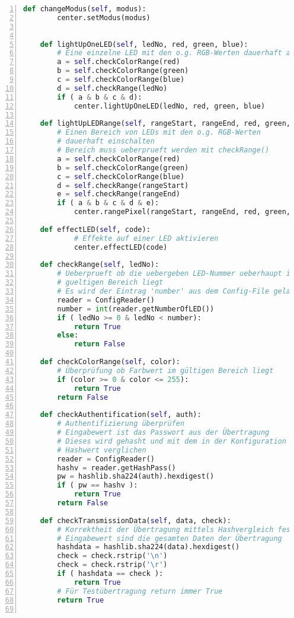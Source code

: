 \begin{lstlisting}[caption =Implementierung des SSL Servers, language=python, frame=single, breaklines=true,columns=fullflexible, commentstyle=\color{gray}\upshape, captionpos=b, numbers = left]
    def changeModus(self, modus):
        center.setModus(modus)


    def lightUpOneLED(self, ledNo, red, green, blue):
        # Eine einzelne LED mit den o.g. RGB-Werten dauerhaft anschalten
        a = self.checkColorRange(red)
        b = self.checkColorRange(green)
        c = self.checkColorRange(blue)
        d = self.checkRange(ledNo)
        if ( a & b & c & d):
            center.lightUpOneLED(ledNo, red, green, blue)

    def lightUpLEDRange(self, rangeStart, rangeEnd, red, green, blue):
        # Einen Bereich von LEDs mit den o.g. RGB-Werten
        # dauerhaft einschalten
        # Bereich muss ueberprueft werden mit checkRange()
        a = self.checkColorRange(red)
        b = self.checkColorRange(green)
        c = self.checkColorRange(blue)
        d = self.checkRange(rangeStart)
        e = self.checkRange(rangeEnd)
        if ( a & b & c & d & e):
            center.rangePixel(rangeStart, rangeEnd, red, green, blue)

    def effectLED(self, code):
            # Effekte auf einer LED aktivieren
            center.effectLED(code)

    def checkRange(self, ledNo):
        # Ueberprueft ob die uebergeben LED-Nummer ueberhaupt im
        # gueltigen Bereich liegt
        # Es wird der Eintrag 'number' aus dem Config-File geladen
        reader = ConfigReader()
        number = int(reader.getNumberOfLED())
        if ( ledNo >= 0 & ledNo < number):
            return True
        else:
            return False

    def checkColorRange(self, color):
        # Überprüfung ob Farbwert im gültigen Bereich liegt
        if (color >= 0 & color <= 255):
            return True
        return False

    def checkAuthentification(self, auth):
        # Authentifizierung überprüfen
        # Eingabewert ist das Passwort aus der Übertragung
        # Dieses wird gehasht und mit dem in der Konfiguration gespeicherten
        # Hashwert verglichen
        reader = ConfigReader()
        hashv = reader.getHashPass()
        pw = hashlib.sha224(auth).hexdigest()
        if ( pw == hashv ):
            return True
        return False

    def checkTransmissionData(self, data, check):
        # Korrektheit der Übertragung mittels Hashvergleich feststellen
        # Eingabewert sind die gesamten Daten der Übertragung
        hashdata = hashlib.sha224(data).hexdigest()
        check = check.rstrip('\n')
        check = check.rstrip('\r')
        if ( hashdata == check ):
            return True
        # Für Testübertragung return immer True
        return True


\end{lstlisting}
